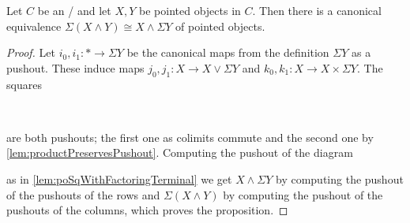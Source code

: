 \begin{lemma}\label{lem:suspensionCommutesWithSmash}
    Let $C$ be an \inftytop/ and let $X,Y$ be pointed objects in $C$. 
    Then there is a canonical equivalence $\Sigma\left(X\wedge Y\right)\cong X\wedge\Sigma Y$ of pointed objects.
    \begin{proof}
        Let $i_0,i_1\colon *\to\Sigma Y$ be the canonical maps from the definition $\Sigma Y$ as a pushout.
        These induce maps $j_0,j_1\colon X \to X\vee\Sigma Y$ and $k_0,k_1\colon X\to X\times\Sigma Y$.
        The squares
        \begin{center}
            \
        \end{center}
        are both pushouts; the first one as colimits commute and the second one by \cref{lem:productPreservesPushout}.
        Computing the pushout of the diagram 
        \begin{center}
        \end{center}
        as in \cref{lem:poSqWithFactoringTerminal} we get $X\wedge\Sigma Y$ by computing the pushout of the pushouts of the rows and $\Sigma\left(X\wedge Y\right)$ by computing the pushout of the pushouts of the columns, which proves the proposition.
    \end{proof}
\end{lemma}
